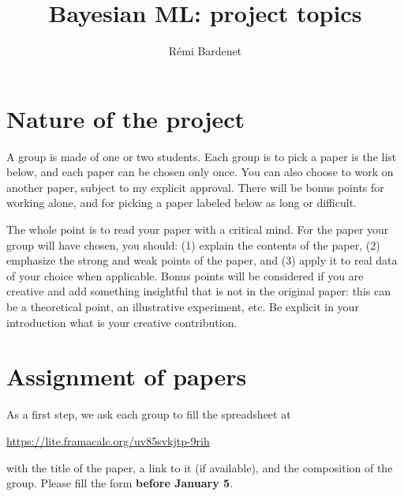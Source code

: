 \documentclass[12pt]{article}%
\begin{document}
\title{Bayesian ML: project topics}
\author{R\'emi Bardenet}
\maketitle

\section{Nature of the project}
A group is made of one or two students.
Each group is to pick a paper is the list below, and each paper can be chosen only once.
You can also choose to work on another paper, subject to my explicit approval.
There will be bonus points for working alone, and for picking a paper labeled below as long or difficult.

The whole point is to read your paper with a critical mind. 
For the paper your group will have chosen, you should: (1) explain the contents of the paper, (2) emphasize the strong and weak points of the paper, and (3) apply it to real data of your choice when applicable. 
Bonus points will be considered if you are creative and add something insightful that is not in the original paper: this can be a theoretical point, an illustrative experiment, etc. 
Be explicit in your introduction what is your creative contribution.

\section{Assignment of papers}
As a first step, we ask each group to fill the spreadsheet at
\begin{center}
   \href{https://lite.framacalc.org/uv85svkjtp-9rih}{https://lite.framacalc.org/uv85svkjtp-9rih}
 \end{center}
with the title of the paper, a link to it (if available), and the composition of the group.
Please fill the form {\bf before January 5}. %
\end{document}
